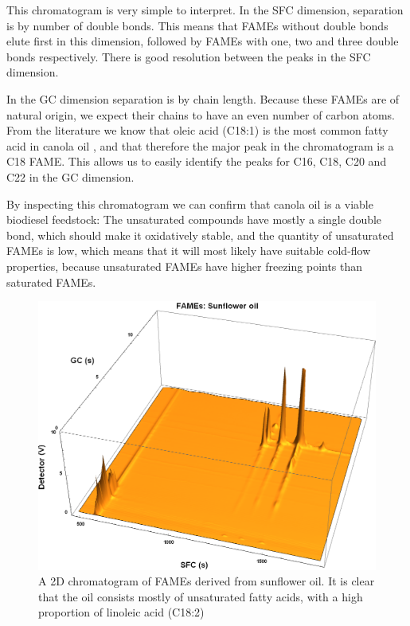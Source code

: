 This chromatogram is very simple to interpret. In the SFC dimension, separation
is by number of double bonds. This means that FAMEs without double bonds elute
first in this dimension, followed by FAMEs with one, two and three double bonds
respectively. There is good resolution between the peaks in the SFC dimension. 

In the GC dimension separation is by chain length. Because these FAMEs are of
natural origin, we expect their chains to have an even number of carbon atoms.
From the literature we know that oleic acid (C18:1) is the most common fatty
acid in canola oil \autocite{JFAOWHOCAC2019}, and that therefore the major peak
in the chromatogram is a C18 FAME. This allows us to easily identify the peaks
for C16, C18, C20 and C22 in the GC dimension.

By inspecting this chromatogram we can confirm that canola oil is a viable
biodiesel feedstock: The unsaturated compounds have mostly a single double bond,
which should make it oxidatively stable, and the quantity of unsaturated FAMEs is 
low, which means that it will most likely have suitable cold-flow properties,
because unsaturated FAMEs have higher freezing points than saturated FAMEs.

\begin{figure}
\centering
\includegraphics[width=\textwidth]{Figures/Sunflower.png}
\decoRule

\caption[SFC×GC of sunflower oil]{A 2D chromatogram of FAMEs derived from
sunflower oil. It is clear that the oil consists mostly of unsaturated fatty
acids, with a high proportion of linoleic acid (C18:2)}

\label{fig:2DSunflower}
\end{figure}

